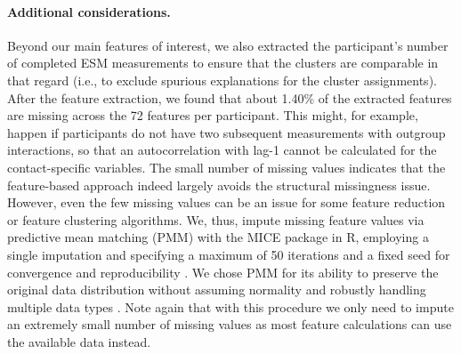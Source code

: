 \paragraph{Additional considerations.}

Beyond our main features of interest, we also extracted the
participant's number of completed ESM measurements to ensure that the
clusters are comparable in that regard (i.e., to exclude spurious
explanations for the cluster assignments). After the feature extraction,
we found that about 1.40\% of the extracted features are missing across
the 72 features per participant. This might, for example, happen if
participants do not have two subsequent measurements with outgroup
interactions, so that an autocorrelation with lag-1 cannot be calculated
for the contact-specific variables. The small number of missing values
indicates that the feature-based approach indeed largely avoids the
structural missingness issue. However, even the few missing values can
be an issue for some feature reduction or feature clustering algorithms.
We, thus, impute missing feature values via predictive mean matching
(PMM) with the MICE package in R, employing a single imputation and
specifying a maximum of 50 iterations and a fixed seed for convergence
and reproducibility \citep[][]{buuren2011}. We chose PMM for its ability
to preserve the original data distribution without assuming normality
and robustly handling multiple data types \citep{vanbuuren2006}. Note
again that with this procedure we only need to impute an extremely small
number of missing values as most feature calculations can use the
available data instead.
